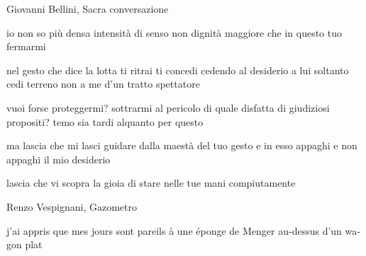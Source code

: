 \clearpage


\begin{artItem}
	Giovanni Bellini, Sacra conversazione
\end{artItem}

\begin{poem}
	\begin{stanza}
		io non so più densa\verseline
		intensità di senso\verseline
		non dignità maggiore\verseline
		che in questo tuo fermarmi
	\end{stanza}

	\begin{stanza}
		nel gesto che dice la lotta\verseline
		ti ritrai ti concedi\verseline
		cedendo al desiderio\verseline
		a lui soltanto cedi terreno\verseline
		non a me d'un tratto spettatore
	\end{stanza}

	\begin{stanza}
		vuoi forse proteggermi?\verseline
		sottrarmi al pericolo\verseline
		di quale disfatta\verseline
		di giudiziosi propositi?\verseline
		temo sia tardi alquanto\verseline
		per questo
	\end{stanza}

	\begin{stanza}
		ma lascia che mi lasci guidare\verseline
		dalla maestà del tuo gesto\verseline
		e in esso appaghi e non appaghi\verseline
		il mio desiderio
	\end{stanza}

	\begin{stanza}
		lascia che vi scopra la gioia\verseline
		di stare nelle tue mani\verseline
		compiutamente
	\end{stanza}
\end{poem}

\clearpage


\begin{artItem}
	Renzo Vespignani, Gazometro
\end{artItem}

\begin{poem}
	\begin{otherlanguage}{french}
		\begin{stanza}
			j'ai appris que mes jours sont\verseline
			pareils à une éponge de Menger\verseline
			au-dessus d'un wagon plat
		\end{stanza}
	\end{otherlanguage}
\end{poem}

